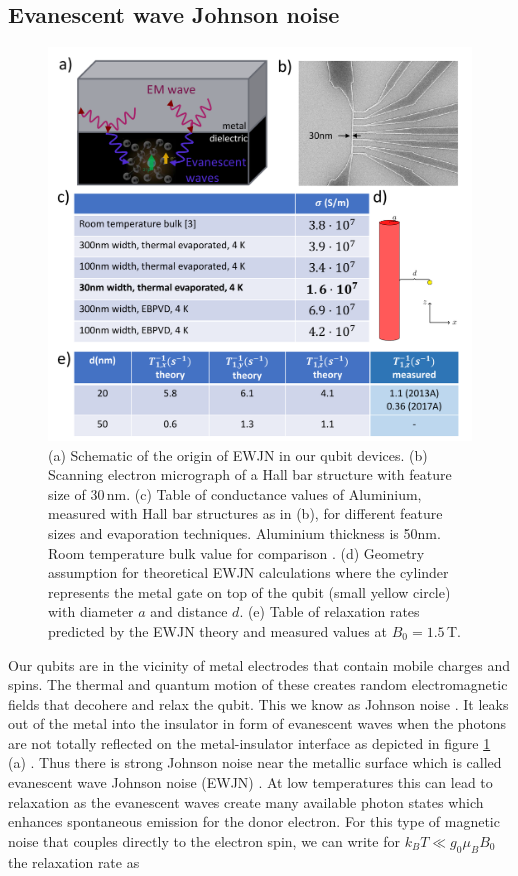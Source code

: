 \documentclass[%
 reprint,
 amsmath,amssymb,
 aps,
]{revtex4-1}
\begin{document}
\subsection{\label{sec:ewjn}Evanescent wave Johnson noise}

\begin{figure}
\centering
\includegraphics[width=\columnwidth]{figures/fig4.pdf}
\caption{
(a) Schematic of the origin of EWJN in our qubit devices. (b) Scanning electron micrograph of a Hall bar structure with feature size of $30\,$nm. (c) Table of conductance values of Aluminium, measured with  Hall bar structures as in (b), for different feature sizes and evaporation techniques. Aluminium thickness is 50nm. Room temperature bulk value for comparison \cite{Serway1998}. (d) Geometry assumption for theoretical EWJN calculations where the cylinder represents the metal gate on top of the qubit (small yellow circle) with diameter $a$ and distance $d$. (e) Table of relaxation rates predicted by the EWJN theory and measured values at $B_0=1.5\,$T. 
}
\label{fig:ewjn}
\end{figure}

Our qubits are in the vicinity of metal electrodes that contain mobile charges and spins. The thermal and quantum motion of these creates random electromagnetic fields that decohere and relax the qubit. This we know as Johnson noise \cite{Johnson1928, Nyquist1928, Callen1951}. It leaks out of the metal into the insulator in form of evanescent waves when the photons are not totally reflected on the metal-insulator interface as depicted in figure \ref{fig:ewjn} (a) \cite{Volokitin2007}. Thus there is strong Johnson noise near the metallic surface which is called evanescent wave Johnson noise (EWJN) \cite{Henkel1999, Poudel2013, Premakumar2017}. At low temperatures this can lead to relaxation as the evanescent waves create many available photon states which enhances spontaneous emission for the donor electron. For this type of magnetic noise that couples directly to the electron spin, we can write for $k_BT\ll g_0\mu_B B_0$ the relaxation rate as
\end{document}
